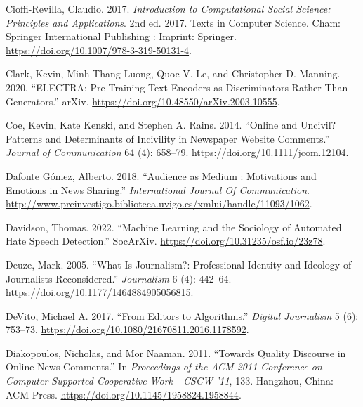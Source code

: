 \documentclass[
]{article}
\newlength{\cslhangindent}
\newlength{\cslentryspacingunit} %
\newenvironment{CSLReferences}[2] %
 {%
  \setlength{\parindent}{0pt}
  \ifodd #1
  \let\oldpar\par
  \def\par{\hangindent=\cslhangindent\oldpar}
  \fi
  \setlength{\parskip}{#2\cslentryspacingunit}
 }%
 {}
\begin{document}
\begin{CSLReferences}{1}{0}
\leavevmode{}%
Cioffi-Revilla, Claudio. 2017. \emph{Introduction to {Computational}
{Social} {Science}: {Principles} and {Applications}}. 2nd ed. 2017.
Texts in {Computer} {Science}. Cham: Springer International Publishing :
Imprint: Springer. \url{https://doi.org/10.1007/978-3-319-50131-4}.

\leavevmode{}%
Clark, Kevin, Minh-Thang Luong, Quoc V. Le, and Christopher D. Manning.
2020. {``{ELECTRA}: {Pre}-Training {Text} {Encoders} as {Discriminators}
{Rather} {Than} {Generators}.''} arXiv.
\url{https://doi.org/10.48550/arXiv.2003.10555}.

\leavevmode{}%
Coe, Kevin, Kate Kenski, and Stephen A. Rains. 2014. {``Online and
{Uncivil}? {Patterns} and {Determinants} of {Incivility} in {Newspaper}
{Website} {Comments}.''} \emph{Journal of Communication} 64 (4):
658--79. \url{https://doi.org/10.1111/jcom.12104}.

\leavevmode{}%
Dafonte Gómez, Alberto. 2018. {``Audience as Medium : Motivations and
Emotions in News Sharing.''} \emph{International Journal Of
Communication}.
\url{http://www.preinvestigo.biblioteca.uvigo.es/xmlui/handle/11093/1062}.

\leavevmode{}%
Davidson, Thomas. 2022. {``Machine Learning and the Sociology of
Automated Hate Speech Detection.''} SocArXiv.
\url{https://doi.org/10.31235/osf.io/23z78}.

\leavevmode{}%
Deuze, Mark. 2005. {``What Is Journalism?: {Professional} Identity and
Ideology of Journalists Reconsidered.''} \emph{Journalism} 6 (4):
442--64. \url{https://doi.org/10.1177/1464884905056815}.

\leavevmode{}%
DeVito, Michael A. 2017. {``From {Editors} to {Algorithms}.''}
\emph{Digital Journalism} 5 (6): 753--73.
\url{https://doi.org/10.1080/21670811.2016.1178592}.

\leavevmode{}%
Diakopoulos, Nicholas, and Mor Naaman. 2011. {``Towards Quality
Discourse in Online News Comments.''} In \emph{Proceedings of the {ACM}
2011 Conference on {Computer} Supported Cooperative Work - {CSCW} '11},
133. Hangzhou, China: ACM Press.
\url{https://doi.org/10.1145/1958824.1958844}.


\end{CSLReferences}
\end{document}
